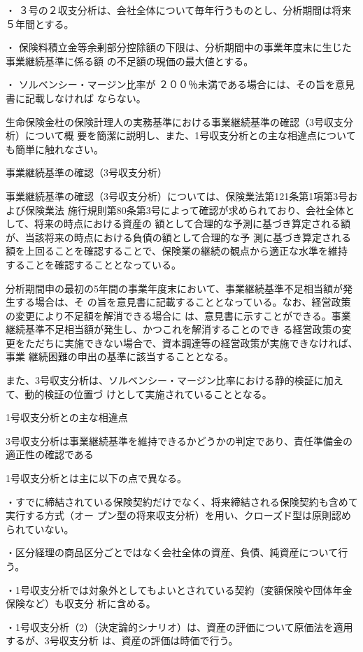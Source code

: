 \documentclass[report,gutter=10mm,fore-edge=10mm,uplatex,dvipdfmx]{jlreq}
\begin{document}
・ ３号の２収支分析は、会社全体について毎年行うものとし、分析期間は将来５年間とする。

・ 保険料積立金等余剰部分控除額の下限は、分析期間中の事業年度末に生じた事業継続基準に係る額
の不足額の現価の最大値とする。

・ ソルベンシー・マージン比率が ２００％未満である場合には、その旨を意見書に記載しなければ
ならない。

生命保険金杜の保険計理人の実務基準における事業継続基準の確認（3号収支分析）について概
要を簡潔に説明し、また、1号収支分析との主な相違点についても簡単に触れなさい。

\answer{}
事業継続基準の確認（3号収支分析）

事業継続基準の確認（3号収支分析）については、保険業法第121条第1項第3号および保険業法
施行規則第80条第3号によって確認が求められており、会社全体として、将来の時点における資産の
額として合理的な予測に基づき算定される額が、当該将来の時点における負債の額として合理的な予
測に基づき算定される額を上回ることを確認することで、保険業の継続の観点から適正な水準を維持
することを確認することとなっている。

分析期間申の最初の5年間の事業年度末において、事業継続基準不足相当額が発生する場合は、そ
の旨を意見書に記載することとなっている。なお、経営政策の変更により不足額を解消できる場合に
は、意見書に示すことができる。事業継続基準不足相当額が発生し、かつこれを解消することのでき
る経営政策の変更をただちに実施できない場合で、資本調達等の経営政策が実施できなければ、事業
継続困難の申出の基準に該当することとなる。

また、3号収支分析は、ソルベンシー・マージン比率における静的検証に加えて、動的検証の位置づ
けとして実施されていることとなる。

1号収支分析との主な相違点

3号収支分析は事業継続基準を維持できるかどうかの判定であり、責任準備金の適正性の確認である

1号収支分析とは主に以下の点で異なる。

・すでに締結されている保険契約だけでなく、将来締結される保険契約も含めて実行する方式（オー
プン型の将来収支分析）を用い、クローズド型は原則認められていない。

・区分経理の商品区分ごとではなく会社全体の資産、負債、純資産について行う。

・1号収支分析では対象外としてもよいとされている契約（変額保険や団体年金保険など）も収支分
析に含める。

・1号収支分析（2）（決定論的シナリオ）は、資産の評価について原価法を適用するが、3号収支分析
は、資産の評価は時価で行う。
\end{document}
